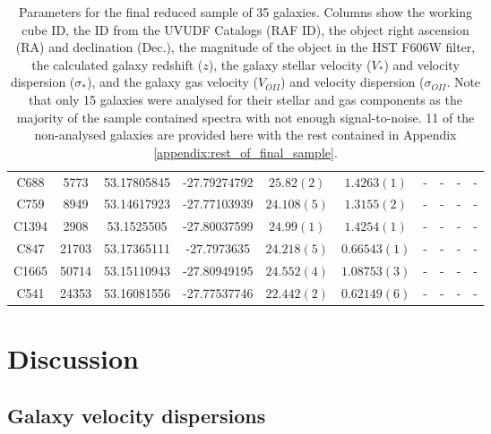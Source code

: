 \documentclass[12pt, twocolumn]{revtex4-1}    %
\begin{document}
\begin{table}
\begin{tabular}{c@{\hskip 10pt}c@{\hskip 10pt}c@{\hskip 10pt}c@{\hskip 10pt}c@{\hskip 10pt}c@{\hskip 10pt}c@{\hskip 10pt}c@{\hskip 10pt}c@{\hskip 10pt}c}
C688 & 5773 & 53.17805845 & -27.79274792 & $25.82(2)$ & $1.4263(1)$ & - & - & - & - \\ 

C759 & 8949 & 53.14617923 & -27.77103939 & $24.108(5)$ & $1.3155(2)$ & - & - & - & - \\ 

C1394 & 2908 & 53.1525505 & -27.80037599 & $24.99(1)$ & $1.4254(1)$ & - & - & - & - \\ 

C847 & 21703 & 53.17365111 & -27.7973635 & $24.218(5)$ & $0.66543(1)$ & - & - & - & - \\ 

C1665 & 50714 & 53.15110943 & -27.80949195 & $24.552(4)$ & $1.08753(3)$ & - & - & - & - \\ 

C541 & 24353 & 53.16081556 & -27.77537746 & $22.442(2)$ & $0.62149(6)$ & - & - & - & - \\ 
 \hline
\end{tabular}
\caption{Parameters for the final reduced sample of 35 galaxies. Columns show the working cube ID, the ID from the UVUDF Catalogs \citep{2015AJ....150...31R} (RAF ID), the object right ascension (RA) and declination (Dec.), the magnitude of the object in the HST F606W filter, the calculated galaxy redshift ($z$), the galaxy stellar velocity ($V_*$) and velocity dispersion ($\sigma_*$), and the galaxy gas velocity ($V_{OII}$) and velocity dispersion ($\sigma_{OII}$. Note that only 15 galaxies were analysed for their stellar and gas components as the majority of the sample contained spectra with not enough signal-to-noise. 11 of the non-analysed galaxies are provided here with the rest contained in Appendix \ref{appendix:rest_of_final_sample}.}
\label{table:final_sample}
\end{table}

\section{Discussion}

\subsection{Galaxy velocity dispersions}
\end{document}
